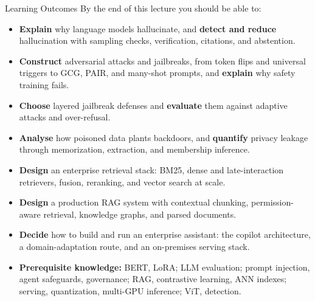 \begin{frame}{Learning Outcomes}
  By the end of this lecture you should be able to:
  \begin{itemize}\footnotesize\itemsep0.12em\setlength{\parskip}{0.2em}
    \item[\textcolor{red}{$\blacktriangleright$}] \textbf{Explain} why language models hallucinate, and \textbf{detect and reduce} hallucination with sampling checks, verification, citations, and abstention.
    \item[\textcolor{red}{$\blacktriangleright$}] \textbf{Construct} adversarial attacks and jailbreaks, from token flips and universal triggers to GCG, PAIR, and many-shot prompts, and \textbf{explain} why safety training fails.
    \item[\textcolor{red}{$\blacktriangleright$}] \textbf{Choose} layered jailbreak defenses and \textbf{evaluate} them against adaptive attacks and over-refusal.
    \item[\textcolor{red}{$\blacktriangleright$}] \textbf{Analyse} how poisoned data plants backdoors, and \textbf{quantify} privacy leakage through memorization, extraction, and membership inference.
    \item[\textcolor{red}{$\blacktriangleright$}] \textbf{Design} an enterprise retrieval stack: BM25, dense and late-interaction retrievers, fusion, reranking, and vector search at scale.
    \item[\textcolor{red}{$\blacktriangleright$}] \textbf{Design} a production RAG system with contextual chunking, permission-aware retrieval, knowledge graphs, and parsed documents.
    \item[\textcolor{red}{$\blacktriangleright$}] \textbf{Decide} how to build and run an enterprise assistant: the copilot architecture, a domain-adaptation route, and an on-premises serving stack.
  \end{itemize}
  \vspace{0.1em}
  \begin{itemize}\scriptsize
    \item[\textcolor{red}{$\blacktriangleright$}] \textbf{Prerequisite knowledge:} BERT, LoRA; LLM evaluation; prompt injection, agent safeguards, governance; RAG, contrastive learning, ANN indexes; serving, quantization, multi-GPU inference; ViT, detection.
  \end{itemize}
\end{frame}
